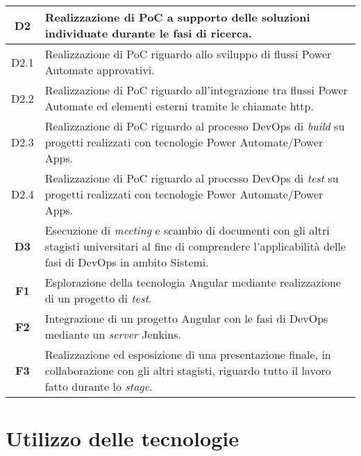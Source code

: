 \begin{longtable}{|c|p{11cm}|}
\hline \textbf{D2}  & Realizzazione di PoC a supporto delle soluzioni individuate durante le fasi di ricerca.\\
\hline D2.1  & Realizzazione di PoC riguardo allo sviluppo di flussi Power Automate approvativi.\\
\hline D2.2  & Realizzazione di PoC riguardo all'integrazione tra flussi Power Automate ed elementi esterni tramite le chiamate \gls{http}.\\
\hline D2.3  & Realizzazione di PoC riguardo al processo \gls{DevOps} di \emph{build} su progetti realizzati con tecnologie Power Automate/Power Apps.\\
\hline D2.4  & Realizzazione di PoC riguardo al processo \gls{DevOps} di \emph{test} su progetti realizzati con tecnologie Power Automate/Power Apps.\\
\hline \textbf{D3}  & Esecuzione di \emph{meeting} e scambio di documenti con gli altri stagisti universitari al fine di comprendere l'applicabilità delle fasi di \gls{DevOps} in ambito \gls{Sistemi}.\\
\hline 
\hline \textbf{F1}  & Esplorazione della tecnologia Angular mediante realizzazione di un progetto di \emph{test}.\\
\hline \textbf{F2}  & Integrazione di un progetto Angular con le fasi di \gls{DevOps} mediante un \emph{server} Jenkins.\\
\hline \textbf{F3}  & Realizzazione ed esposizione di una presentazione finale, in collaborazione con gli altri stagisti, riguardo tutto il lavoro fatto durante lo \emph{stage}.\\
\end{longtable}

\section{Utilizzo delle tecnologie}%
